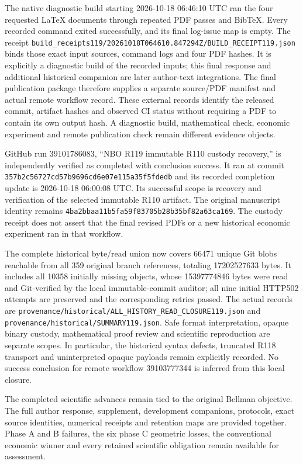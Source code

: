 The native diagnostic build starting 2026-10-18 06:46:10 UTC ran the four requested LaTeX documents through repeated PDF passes and BibTeX. Every recorded command exited successfully, and its final log-issue map is empty. The receipt \nolinkurl{build_receipts119/20261018T064610.847294Z/BUILD_RECEIPT119.json} binds those exact input sources, command logs and four PDF hashes. It is explicitly a diagnostic build of the recorded inputs; this final response and additional historical companion are later author-text integrations. The final publication package therefore supplies a separate source/PDF manifest and actual remote workflow record. These external records identify the released commit, artifact hashes and observed CI status without requiring a PDF to contain its own output hash. A diagnostic build, mathematical check, economic experiment and remote publication check remain different evidence objects.

GitHub run 39101786083, ``NBO R119 immutable R110 custody recovery,'' is independently verified as completed with conclusion success. It ran at commit \nolinkurl{357b2c56727cd57b9696cd6e07e115a35f5fdedb} and its recorded completion update is 2026-10-18 06:00:08 UTC. Its successful scope is recovery and verification of the selected immutable R110 artifact. The original manuscript identity remains \nolinkurl{4ba2bbaa11b5fa59f83705b28b35bf82a63ca169}. The custody receipt does not assert that the final revised PDFs or a new historical economic experiment ran in that workflow.

The complete historical byte/read union now covers 66471 unique Git blobs reachable from all 359 original branch references, totaling 17202527633 bytes. It includes all 10358 initially missing objects, whose 15397774846 bytes were read and Git-verified by the local immutable-commit auditor; all nine initial HTTP502 attempts are preserved and the corresponding retries passed. The actual records are \nolinkurl{provenance/historical/ALL_HISTORY_READ_CLOSURE119.json} and \nolinkurl{provenance/historical/SUMMARY119.json}. Safe format interpretation, opaque binary custody, mathematical proof review and scientific reproduction are separate scopes. In particular, the historical syntax defects, truncated R118 transport and uninterpreted opaque payloads remain explicitly recorded. No success conclusion for remote workflow 39103777344 is inferred from this local closure.



The completed scientific advances remain tied to the original Bellman objective. The full author response, supplement, development companions, protocols, exact source identities, numerical receipts and retention maps are provided together. Phase A and B failures, the six phase C geometric losses, the conventional economic winner and every retained scientific obligation remain available for assessment.
